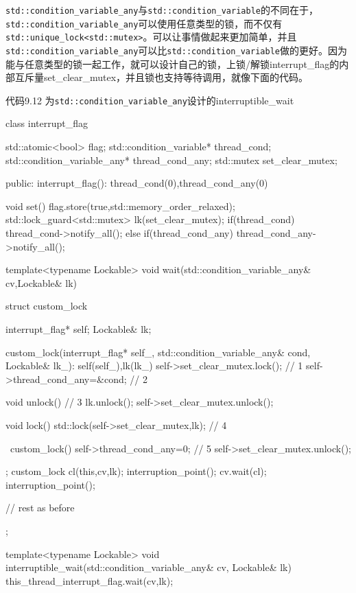 \texttt{std::condition\_variable\_any}与\texttt{std::condition\_variable}的不同在于，\texttt{std::condition\_variable\_any}可以使用任意类型的锁，而不仅有\texttt{std::unique\_lock<std::mutex>}。可以让事情做起来更加简单，并且\texttt{std::condition\_variable\_any}可以比\texttt{std::condition\_variable}做的更好。因为能与任意类型的锁一起工作，就可以设计自己的锁，上锁/解锁interrupt\_flag的内部互斥量set\_clear\_mutex，并且锁也支持等待调用，就像下面的代码。

代码9.12 为\texttt{std::condition\_variable\_any}设计的interruptible\_wait

\begin{cpp}
class interrupt_flag
{
  std::atomic<bool> flag;
  std::condition_variable* thread_cond;
  std::condition_variable_any* thread_cond_any;
  std::mutex set_clear_mutex;

public:
  interrupt_flag():
    thread_cond(0),thread_cond_any(0)
  {}

  void set()
  {
    flag.store(true,std::memory_order_relaxed);
    std::lock_guard<std::mutex> lk(set_clear_mutex);
    if(thread_cond)
    {
      thread_cond->notify_all();
    }
    else if(thread_cond_any)
    {
      thread_cond_any->notify_all();
    }
  }

  template<typename Lockable>
  void wait(std::condition_variable_any& cv,Lockable& lk)
  {
    struct custom_lock
    {
      interrupt_flag* self;
      Lockable& lk;

      custom_lock(interrupt_flag* self_,
                  std::condition_variable_any& cond,
                  Lockable& lk_):
        self(self_),lk(lk_)
      {
        self->set_clear_mutex.lock();  // 1
        self->thread_cond_any=&cond;  // 2
      }

      void unlock()  // 3
      {
        lk.unlock();
        self->set_clear_mutex.unlock();
      }

      void lock()
      {
        std::lock(self->set_clear_mutex,lk);  // 4
      }

      ~custom_lock()
      {
        self->thread_cond_any=0;  // 5
        self->set_clear_mutex.unlock();
      }
    };
    custom_lock cl(this,cv,lk);
    interruption_point();
    cv.wait(cl);
    interruption_point();
  }
  // rest as before
};

template<typename Lockable>
void interruptible_wait(std::condition_variable_any& cv,
                        Lockable& lk)
{
  this_thread_interrupt_flag.wait(cv,lk);
}
\end{cpp}

